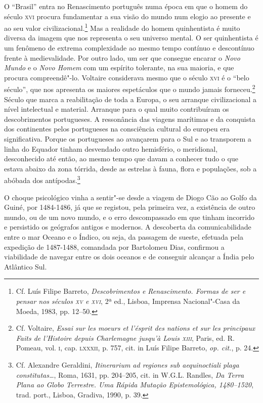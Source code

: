 O ``Brasil'' entra no Renascimento português numa época em que o
homem do século \textsc{xvi} procura fundamentar a sua visão do mundo num elogio
ao presente e ao seu valor civilizacional.\footnote{ Cf. Luís
Filipe Barreto, \textit{Descobrimentos e Renascimento. Formas de ser e
pensar nos séculos \textsc{xv} e \textsc{xvi}}, 2ª ed., Lisboa, Imprensa Nacional"-Casa da
Moeda, 1983, pp. 12--50.} Mas a realidade do homem quinhentista é 
muito diversa da imagem que nos representa o seu
universo mental. O ser quinhentista é um fenômeno de extrema
complexidade ao mesmo tempo contínuo e descontínuo frente à
medievalidade. Por outro lado, um ser que consegue encarar o
\textit{Novo Mundo} e o \textit{Novo Homem} com um espírito tolerante,
na sua maioria, e que procura compreendê"-lo. Voltaire considerava
mesmo que o século \textsc{xvi} é o ``belo século'', que nos apresenta os maiores
espetáculos que o mundo jamais forneceu.\footnote{ Cf. Voltaire,
\textit{Essai sur les moeurs et l'ésprit des nations et sur
les principaux Faits de l'Histoire depuis Charlemagne jusqu'à Louis
\textsc{xiii}}, Paris, ed. R. Pomeau, vol. \textsc{i}, cap. \textsc{lxxxii}, p. 757, cit. in Luís
Filipe Barreto, \textit{op. cit.}, p. 24.} Século que marca a
reabilitação de toda a Europa, o seu arranque civilizacional a nível
intelectual e material. 
Arranque para o qual muito contribuíram os descobrimentos
portugueses. A ressonância das viagens marítimas e da conquista dos
continentes pelos portugueses na consciência cultural do europeu era
significativa. Porque os portugueses ao avançarem para o Sul e ao
transporem a linha do Equador tinham desvendado outro hemisfério, o
meridional, desconhecido até então, ao mesmo tempo que davam a
conhecer tudo o que estava abaixo da zona tórrida, desde as estrelas à
fauna, flora e populações, sob a abóbada dos antípodas.\footnote{ Cf. Alexandre 
Geraldini, \textit{Itinerarium ad regiones sub
aequinoctiali plaga constitutas\ldots{}}, Roma, 1631, pp. 204--205, cit. in
W.G.L. Randles, \textit{Da Terra Plana ao Globo Terrestre. Uma Rápida
Mutação Epistemológica, 1480--1520}, trad. port., Lisboa,
Gradiva, 1990, p. 39.} 

O choque psicológico vinha a sentir"-se desde a viagem de Diogo Cão ao
Golfo da Guiné, por 1484-1486, já que se registou, pela primeira vez, a
existência de outro mundo, ou de um novo mundo, e o erro descompassado
em que tinham incorrido e persistido os geógrafos antigos e modernos. A
descoberta da comunicabilidade entre o mar Oceano e o Índico, ou seja,
da passagem de sueste, efetuada pela expedição de 1487-1488, comandada
por Bartolomeu Dias, confirmou a viabilidade de navegar entre os dois
oceanos e de conseguir alcançar a Índia pelo Atlântico Sul. 

